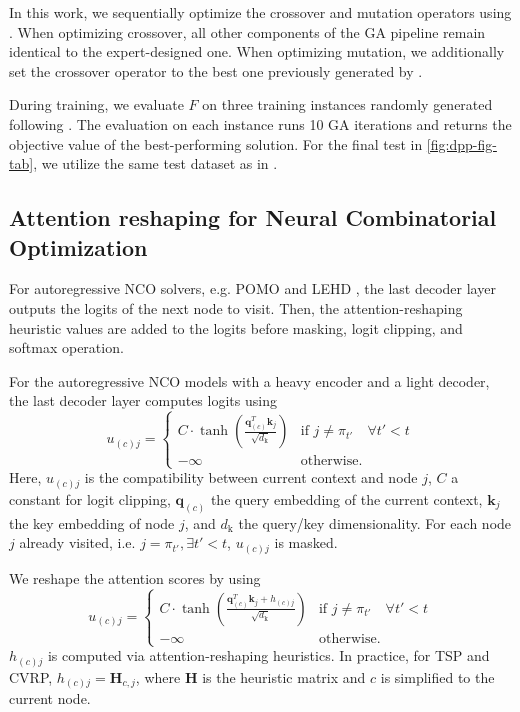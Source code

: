 In this work, we sequentially optimize the crossover and mutation operators using \our{}. When optimizing crossover, all other components of the GA pipeline remain identical to the expert-designed one. When optimizing mutation, we additionally set the crossover operator to the best one previously generated by \our{}.

During training, we evaluate \( F \) on three training instances randomly generated following \cite[Appendix A.5]{kim2023devformer}. The evaluation on each instance runs 10 GA iterations and returns the objective value of the best-performing solution. For the final test in \cref{fig:dpp-fig-tab}, we utilize the same test dataset as in \cite{kim2023devformer}.



\subsection{Attention reshaping for Neural Combinatorial Optimization}\label{app: attention reshaping}


For autoregressive NCO solvers, e.g. POMO \cite{kwon2020pomo} and LEHD \cite{luo2023nco_heavy_decoder}, the last decoder layer outputs the logits of the next node to visit. Then, the attention-reshaping heuristic values are added to the logits before masking, logit clipping, and softmax operation.

For the autoregressive NCO models with a heavy encoder and a light decoder, the last decoder layer computes logits using \cite{kool2019attention} 
\begin{equation}
	u_{(c)j} = \begin{cases}
		C \cdot \tanh \left(\frac{\mathbf{q}_{(c)}^T \mathbf{k}_j}{\sqrt{d_{\text{k}}}}\right) & \text{if } j \neq \pi_{t'} \quad \forall t' < t \\
        -\infty & \text{otherwise.}
    \end{cases}
\end{equation}
Here, \( u_{(c)j} \) is the compatibility between current context and node \(j\), \( C \) a constant for logit clipping, \( \mathbf{q}_{(c)} \) the query embedding of the current context, \( \mathbf{k}_j \) the key embedding of node \( j \), and \(d_{\text{k}}\) the query/key dimensionality. For each node \( j \) already visited, i.e. \( j = \pi_{t'}, \exists t' < t \), \( u_{(c)j} \) is masked.

We reshape the attention scores by using
\begin{equation}
	u_{(c)j} = \begin{cases}
		C \cdot \tanh \left(\frac{\mathbf{q}_{(c)}^T \mathbf{k}_j + h_{(c)j}}{\sqrt{d_{\text{k}}}}\right) & \text{if } j \neq \pi_{t'} \quad \forall t' < t \\
        -\infty & \text{otherwise.}
    \end{cases}
\end{equation}
\( h_{(c)j} \) is computed via attention-reshaping heuristics. In practice, for TSP and CVRP, \( h_{(c)j} = \mathbf{H}_{c, j}\), where \( \mathbf{H} \) is the heuristic matrix and \( c \) is simplified to the current node.


